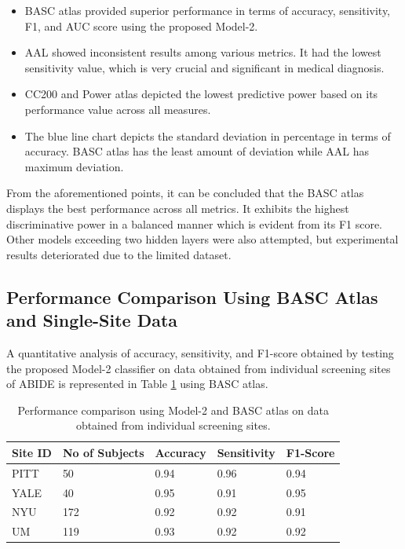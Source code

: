 \begin{itemize}
    \item BASC atlas provided superior performance in terms of accuracy, sensitivity, F1, and AUC score using the proposed Model-2.
    \item AAL showed inconsistent results among various metrics. It had the lowest sensitivity value, which is very crucial and significant in medical diagnosis.
    \item CC200 and Power atlas depicted the lowest predictive power based on its performance value across all measures.
    \item The blue line chart depicts the standard deviation in percentage in terms of accuracy. BASC atlas has the least amount of deviation while AAL has maximum deviation.
\end{itemize}

From the aforementioned points, it can be concluded that the BASC atlas displays the best performance across all metrics. It exhibits the highest discriminative power in a balanced manner which is evident from its F1 score. Other models exceeding two hidden layers were also attempted, but experimental results deteriorated due to the limited dataset.

\subsection{Performance Comparison Using BASC Atlas and Single-Site Data}

A quantitative analysis of accuracy, sensitivity, and F1-score obtained by testing the proposed Model-2 classifier on data obtained from individual screening sites of ABIDE is represented in Table \ref{tab:4.6} using BASC atlas.

\begin{table}[!htb]
\begin{center}
    \caption{Performance comparison using Model-2 and BASC atlas on data obtained from 
individual screening sites.}
    \label{tab:4.6}
\begin{tabular}{|l|l|l|l|l|}
\hline
\textbf{Site ID} & \textbf{No of Subjects} & \textbf{Accuracy} & \textbf{Sensitivity} & \textbf{F1-Score} \\ \hline
PITT             & 50                      & 0.94              & 0.96                 & 0.94              \\ \hline
YALE             & 40                      & 0.95              & 0.91                 & 0.95              \\ \hline
NYU              & 172                     & 0.92              & 0.92                 & 0.91              \\ \hline
UM               & 119                     & 0.93              & 0.92                 & 0.92              \\ \hline
\end{tabular}
\end{center}
\end{table}

